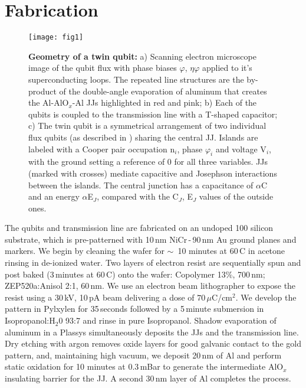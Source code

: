 \section{Fabrication}


\begin{figure}[h]
  \texttt{[image: fig1]}
  \caption{\small \textbf{Geometry of a twin qubit:}  a) Scanning electron microscope image of
    the qubit flux with phase biases $ \varphi $,  $ \eta\varphi $ applied to it's superconducting loops. The
    repeated line  structures are the by-product  of the double-angle evaporation  of aluminum
    that creates the Al-AlO$_x$-Al  JJs highlighted in red and pink; b) Each  of the qubits is
    coupled  to the  transmission line  with a  T-shaped  capacitor; c)  The twin  qubit is  a
    symmetrical arrangement of two individual flux qubits (as described in \cite{orlando1999})
    sharing the central  JJ.  Islands are labeled  with a Cooper pair  occupation n$_i$, phase
    $\varphi_i$ and voltage V$_i$, with the ground setting a reference of 0 for all three variables.
    JJs  (marked with  crosses)  mediate  capacitive and  Josephson  interactions between  the
    islands.    The   central  junction   has   a   capacitance   of   $\alpha$C  and   an   energy
    $ \alpha$E$_{J}$, compared with the C$_J$, E$_J$ values of the outside ones.}
  \label{fig:setup}
\end{figure}

\noindent The qubits and transmission line are fabricated on an undoped 100 silicon substrate,
which is pre-patterned with  10\,nm NiCr\,-\,90\,nm Au ground planes and  markers. We begin by
cleaning the wafer  for $\sim$~10 minutes at  60\,C in acetone rinsing in  de-ionized water.  Two
layers of electron resist are sequentially spun  and post baked (3\,minutes at 60\,C) onto the
wafer:  {Copolymer 13\%},  700\,nm;  ZEP520a:Anisol  2:1, 60\,nm.   We  use  an electron  beam
lithographer  to  expose  the  resist  using  a 30\,kV,  10\,pA  beam  delivering  a  dose  of
$ 70\,\mu $C/cm$^2$.  We develop the pattern in Pylxylen for 35\,seconds followed by a 5\,minute
submersion in  Isopropanol:H$_2$0 93:7 and rinse  in pure Isopropanol.  Shadow  evaporation of
aluminum in a Plassys \cite{wu2013} simultaneously deposits the JJs and the transmission line.
Dry etching  with argon removes oxide  layers for good  galvanic contact to the  gold pattern,
and, maintaining  high vacuum, we  deposit 20\,nm  of Al and  perform static oxidation  for 10
minutes at 0.3\,mBar  to generate the intermediate  AlO$_x$ insulating barrier for  the JJ.  A
second 30\,nm layer of Al completes the process.

